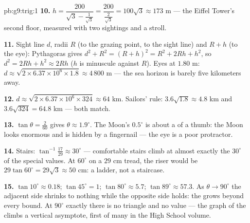 \begin{solution}{pb:g9:trig:1}
\textbf{10.} $h = \dfrac{200}{\sqrt3 - \frac{1}{\sqrt3}}
= \dfrac{200}{\frac{2}{\sqrt3}} = 100\sqrt3 \approx 173$ m ---
the Eiffel Tower's second floor, measured with two sightings
and a stroll.

\textbf{11.} Sight line $d$, radii $R$ (to the grazing point,
 to the sight line) and $R + h$ (to the eye):
Pythagoras gives $d^2 + R^2 = (R + h)^2 = R^2 + 2Rh + h^2$, so
$d^2 = 2Rh + h^2 \approx 2Rh$ ($h$ is minuscule against $R$).
Eyes at $1.80$ m:
$d \approx \sqrt{2 \times 6.37 \times 10^6 \times 1.8}
\approx 4\,800$ m --- the sea horizon is barely five
kilometers away.

\textbf{12.} $d \approx \sqrt{2 \times 6.37 \times 10^6 \times
324} \approx 64$ km. Sailors' rule: $3.6\sqrt{1.8} \approx
4.8$ km and $3.6\sqrt{324} = 64.8$ km --- both match.

\textbf{13.} $\tan\theta = \frac{2}{60}$ gives $\theta \approx
1.9^\circ$. The Moon's $0.5^\circ$ is about a \emph{} of
a thumb: the Moon looks enormous and is hidden by a fingernail
--- the eye is a poor protractor.

\textbf{14.} Stairs: $\tan^{-1}\frac{17}{29} \approx 30^\circ$
--- comfortable stairs climb at almost exactly the
$30^\circ$ of the special values. At $60^\circ$ on a $29$ cm
tread, the riser would be $29\tan 60^\circ = 29\sqrt3 \approx
50$ cm: a ladder, not a staircase.

\textbf{15.} $\tan 10^\circ \approx 0.18$;
$\tan 45^\circ = 1$; $\tan 80^\circ \approx 5.7$;
$\tan 89^\circ \approx 57.3$. As $\theta \to 90^\circ$ the
adjacent side shrinks to nothing while the opposite side holds:
the  grows beyond every bound. At $90^\circ$ exactly
there is no triangle and no value --- the graph of the 
climbs a vertical asymptote, first of many in the High School
volume.
\end{solution}

